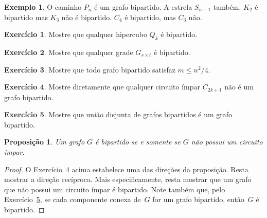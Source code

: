 \documentclass[12pt, a4paper]{article}
\newtheorem{prop}[teor]{Proposição}
\theoremstyle{definition}
\newtheorem{exem}[teor]{Exemplo}
\newtheorem{exer}{Exercício}
\begin{document}
\begin{exem}
O caminho $P_n$ é um grafo bipartido. A estrela $S_{n-1}$ também. $K_2$ é bipartido mas $K_3$ não é bipartido. $C_4$ é bipartido, mas $C_3$ não.
\end{exem}

\begin{exer}
Mostre que qualquer hipercubo $Q_k$ é bipartido. 
\end{exer}

\begin{exer}
Mostre que qualquer grade $G_{s \times t}$ é bipartido.
\end{exer}

\begin{exer}
Mostre que todo grafo bipartido satisfaz $m \leq n^2/4$.
\end{exer}

\begin{exer}
\label{exer:cimpar}
Mostre diretamente que qualquer circuito ímpar $C_{2k+1}$ não é um grafo bipartido.
\end{exer}

\begin{exer}
\label{exer:uni_bip}
Mostre que união disjunta de grafos bipartidos é um grafo bipartido.
\end{exer}

\begin{prop}
Um grafo $G$ é bipartido se e somente se $G$ não possui um circuito ímpar. 
\end{prop}

\begin{proof}
O Exercício~\ref{exer:cimpar} acima estabelece uma das direções da proposição. Resta mostrar a direção recíproca. Mais especificamente, resta mostrar que um grafo que não possui um circuito ímpar é bipartido. 
Note também que, pelo Exercício~\ref{exer:uni_bip}, se cada componente conexa de~$G$ for um grafo bipartido, então~$G$ é bipartido.
\end{proof}
\end{document}
